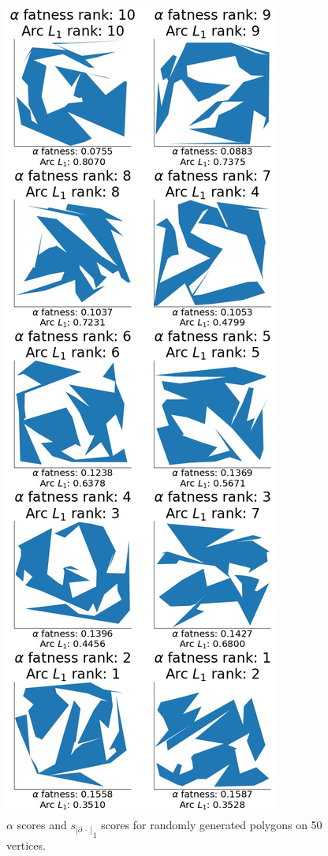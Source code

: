 \documentclass[]{jocg}
\newcommand{\abs}[1]{|#1|}
\newcommand{\chordarc}{{s_{\abs{\partial~\cdot~}}}}
\theoremstyle{definition}
\theoremstyle{remark}
\begin{document}
\begin{figure}[t]
  \centering
  \includegraphics[height=0.8\textheight]{../plots/u_50_alpha_score_chord_arc_one_vertices_0-05_delta_ranking.jpg}
  \caption{$\alpha$ scores and ${\chordarc}_{1}$ scores for randomly
  generated polygons on 50 vertices.}
  \label{fig:alph-one-50}
\end{figure}
\end{document}
